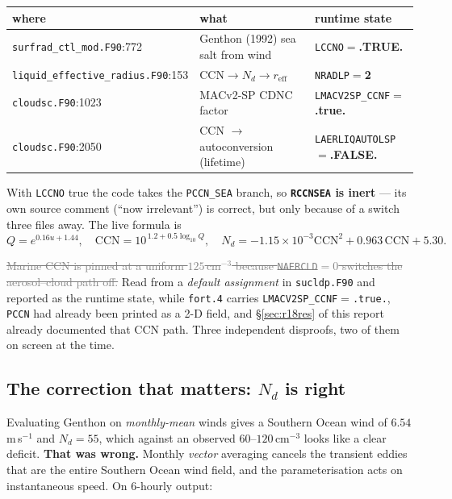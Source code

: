 \documentclass[10pt]{article}
\newcommand{\dead}[1]{\textcolor{gray}{\sout{#1}}}
\begin{document}
\begin{center}\footnotesize
\begin{tabular}{l l l}
\toprule
where & what & runtime state \\
\midrule
\texttt{surfrad\_ctl\_mod.F90}:772 & Genthon (1992) sea salt from wind & \texttt{LCCNO}$=$\textbf{.TRUE.} \\
\texttt{liquid\_effective\_radius.F90}:153 & $\mathrm{CCN}\to N_d\to r_{\text{eff}}$ & \texttt{NRADLP}$=$\textbf{2} \\
\texttt{cloudsc.F90}:1023 & MACv2-SP CDNC factor & \texttt{LMACV2SP\_CCNF}$=$\textbf{.true.} \\
\texttt{cloudsc.F90}:2050 & CCN $\to$ autoconversion (lifetime) & \texttt{LAERLIQAUTOLSP}$=$\textbf{.FALSE.} \\
\bottomrule
\end{tabular}
\end{center}

\noindent With \texttt{LCCNO} true the code takes the \texttt{PCCN\_SEA} branch, so
\textbf{\texttt{RCCNSEA} is inert} --- its own source comment (``now irrelevant'') is
correct, but only because of a switch three files away. The live formula is
\[
Q=e^{0.16u+1.44},\quad \mathrm{CCN}=10^{\,1.2+0.5\log_{10}Q},\quad
N_d=-1.15{\times}10^{-3}\mathrm{CCN}^2+0.963\,\mathrm{CCN}+5.30 .
\]

\dead{Marine CCN is pinned at a uniform $125$\,cm$^{-3}$ because \texttt{NAERCLD}$=0$
switches the aerosol--cloud path off.} Read from a \emph{default assignment} in
\texttt{sucldp.F90} and reported as the runtime state, while \texttt{fort.4} carries
\texttt{LMACV2SP\_CCNF}$=$\texttt{.true.}, \texttt{PCCN} had already been printed as a
2-D field, and \S\ref{sec:r18res} of this report already documented that CCN path. Three
independent disproofs, two of them on screen at the time.

\subsection{The correction that matters: $N_d$ is right}\label{sub:r24nd}
Evaluating Genthon on \emph{monthly-mean} winds gives a Southern Ocean wind of
$6.54$\,m\,s$^{-1}$ and $N_d=55$, which against an observed $60$--$120$\,cm$^{-3}$ looks
like a clear deficit. \textbf{That was wrong.} Monthly \emph{vector} averaging cancels the
transient eddies that are the entire Southern Ocean wind field, and the parameterisation
acts on instantaneous speed. On 6-hourly output:
\end{document}
